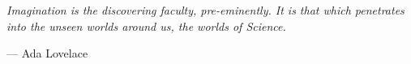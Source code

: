 

\chapter*{}



\vspace*{\fill} \epigraph{\itshape Imagination is the discovering faculty, pre-eminently. It is that which penetrates into the unseen worlds around us, the worlds of Science.}{— Ada Lovelace}
\vfill\clearpage

